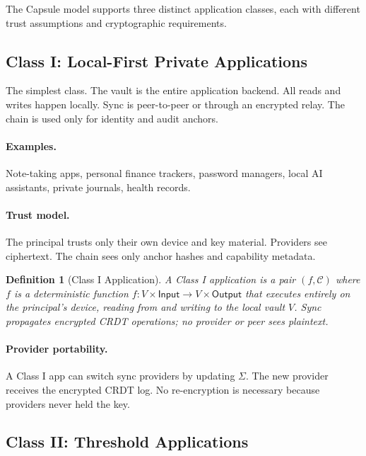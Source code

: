 \documentclass[11pt,a4paper]{article}
\newtheorem{definition}{Definition}[section]
\begin{document}
The Capsule model supports three distinct application classes, each with
different trust assumptions and cryptographic requirements.

\subsection{Class I: Local-First Private Applications}\label{sec:class1}

The simplest class. The vault is the entire application backend. All reads and
writes happen locally. Sync is peer-to-peer or through an encrypted relay.
The chain is used only for identity and audit anchors.

\paragraph{Examples.} Note-taking apps, personal finance trackers, password
managers, local AI assistants, private journals, health records.

\paragraph{Trust model.} The principal trusts only their own device and key
material. Providers see ciphertext. The chain sees only anchor hashes and
capability metadata.

\begin{definition}[Class I Application]\label{def:class1}
A Class I application is a pair $(f, \mathcal{C})$ where $f$ is a deterministic
function $f: V \times \mathsf{Input} \to V \times \mathsf{Output}$ that executes
entirely on the principal's device, reading from and writing to the local vault $V$.
Sync propagates encrypted CRDT operations; no provider or peer sees plaintext.
\end{definition}

\paragraph{Provider portability.} A Class I app can switch sync providers by
updating $\Sigma$. The new provider receives the encrypted CRDT log. No
re-encryption is necessary because providers never held the key.

\subsection{Class II: Threshold Applications}\label{sec:class2}
\end{document}
